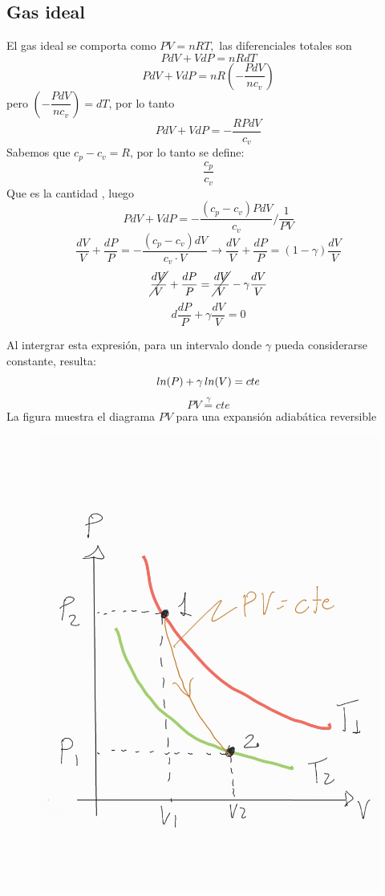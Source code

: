 \documentclass[12pt,twocolumn,a4paper]{report}
\begin{document}
\subsection*{Gas ideal}
El gas ideal se comporta como $PV = nRT,$ las diferenciales totales son 
$$
PdV + VdP = nRdT  
$$
$$
PdV + VdP = nR \left( -\dfrac{PdV}{nc_v} \right)
$$
pero $\left( -\dfrac{PdV}{nc_v} \right) = dT$, por lo tanto 
$$
PdV + VdP = - \dfrac{RPdV}{c_v} 
$$
Sabemos que $c_p - c_v = R$, por lo tanto se define: 
$$
\dfrac{c_p}{c_v}
$$ 
Que es la cantidad , luego 
$$
PdV + VdP = - \frac{(c_p - c_v)PdV}{c_v} /\dfrac{1}{PV}
$$
$$
\dfrac{dV}{V} + \dfrac{dP}{P} = - \frac{(c_p - c_v)dV}{c_v \cdot V} \rightarrow \dfrac{dV}{V} + \dfrac{dP}{P} = (1 - \gamma)\dfrac{dV}{V}
$$
$$
\cancel{\dfrac{dV}{V}} + \dfrac{dP}{P} = \cancel{\dfrac{dV}{V}} -\gamma \dfrac{dV}{V}
$$
$$
d\frac{dP}{P} + \gamma \dfrac{dV}{V} = 0
$$

Al intergrar esta expresión, para un intervalo donde $\gamma$ pueda considerarse constante, resulta: 
$$
ln(P) + \gamma \thinspace ln(V) = cte 
$$
$$
PV \stackrel{\gamma}{=} cte 
$$
La figura muestra el diagrama $PV$ para una expansión adiabática reversible

\begin{figure}[H]
\centering
\includegraphics[scale=0.3]{graficos/02_10.jpg}
\end{figure}
\end{document}

